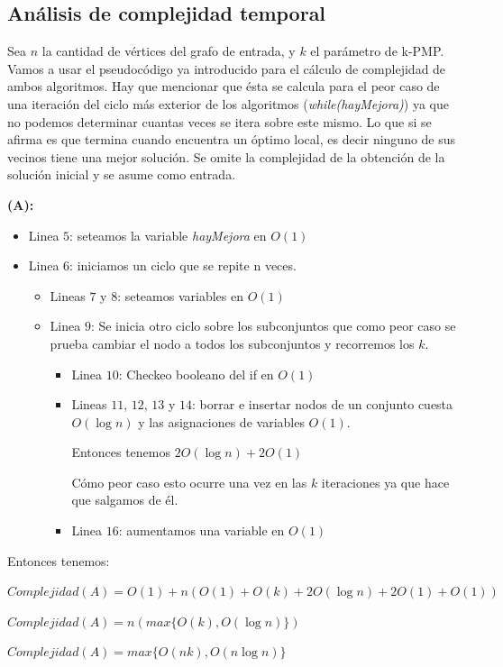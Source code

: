 \subsection{Análisis de complejidad temporal}
Sea $n$ la cantidad de vértices del grafo de entrada, y $k$ el parámetro de k-PMP. Vamos a usar el pseudocódigo ya introducido para el cálculo de complejidad de ambos algoritmos. Hay que mencionar que ésta se calcula para el peor caso de una iteración del ciclo más exterior de los algoritmos (\textit{while(hayMejora)}) ya que no podemos determinar cuantas veces se itera sobre este mismo. Lo que si se afirma es que termina cuando encuentra un óptimo local, es decir ninguno de sus vecinos tiene una mejor solución. Se omite la complejidad de la obtención de la solución inicial y se asume como entrada.

\textbf{(A):}

\begin{itemize}
    \item Linea $5$: seteamos la variable \textit{hayMejora} en $O(1)$
    \item Linea $6$: iniciamos un ciclo que se repite n veces.
    \begin{itemize}
        \item Lineas $7$ y $8$: seteamos variables en $O(1)$
        \item Linea $9$: Se inicia otro ciclo sobre los subconjuntos que como peor caso se prueba cambiar el nodo a todos los subconjuntos y recorremos los $k$.
        \begin{itemize}
            \item Linea $10$: Checkeo booleano del if en $O(1)$
            \item Lineas $11$, $12$, $13$ y $14$: borrar e insertar nodos de un conjunto cuesta $O(\log n)$ y las asignaciones de variables $O(1)$. 

            Entonces tenemos $2O(\log n) + 2O(1)$

            Cómo peor caso esto ocurre una vez en las $k$ iteraciones ya que hace que salgamos de él.
            \item Linea $16$: aumentamos una variable en $O(1)$
        \end{itemize}
    \end{itemize}
\end{itemize}
Entonces tenemos:
\begin{center}
    $Complejidad(A) = O(1) + n(O(1)+O(k)+2O(\log n)+2O(1)+O(1))$

    $Complejidad(A) = n(max\{O(k),O(\log n)\})$

    $Complejidad(A) = max\{O(nk),O(n\log n)\}$
\end{center}

